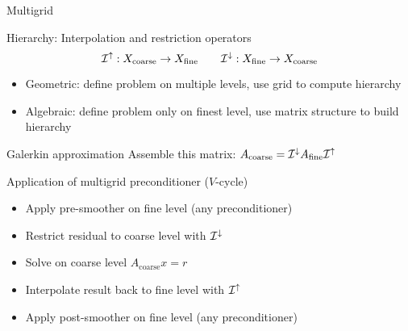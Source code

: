 \begin{frame}[shrink=5]{Multigrid}
  \begin{block}{Hierarchy: Interpolation and restriction operators}
    \begin{equation*}
    \mathcal{I}^\uparrow : X_{\text{coarse}} \to X_{\text{fine}} \qquad
    \mathcal{I}^\downarrow :  X_{\text{fine}} \to X_{\text{coarse}}
  \end{equation*}
  \end{block}
  \begin{itemize}
  \item Geometric: define problem on multiple levels, use grid to compute hierarchy
  \item Algebraic: define problem only on finest level, use matrix structure to build hierarchy
  \end{itemize}
  \begin{block}{Galerkin approximation}
    Assemble this matrix: $A_{\text{coarse}} = \mathcal{I}^\downarrow A_{\text{fine}} \mathcal{I}^\uparrow$
  \end{block}
  \begin{block}{Application of multigrid preconditioner ($V$-cycle)}
    \begin{itemize}
    \item Apply pre-smoother on fine level (any preconditioner)
    \item Restrict residual to coarse level with $\mathcal{I}^\downarrow$
    \item Solve on coarse level $A_{\text{coarse}} x = r$
    \item Interpolate result back to fine level with $\mathcal{I}^\uparrow$
    \item Apply post-smoother on fine level (any preconditioner)
    \end{itemize}
  \end{block}
\end{frame}


